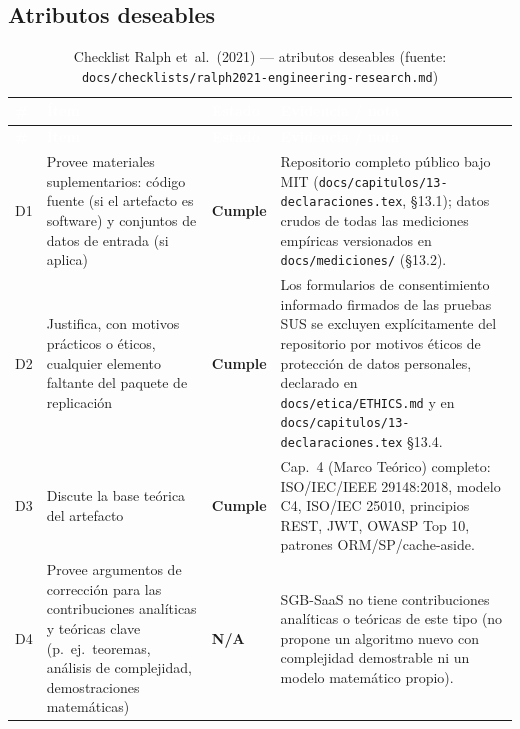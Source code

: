 \subsection{Atributos deseables}

\begin{center}
\scriptsize
\renewcommand{\arraystretch}{1.15}
\begin{longtable}{|p{0.7cm}|p{4.2cm}|p{1.6cm}|p{7.0cm}|}
\caption{Checklist Ralph et~al.\ (2021) --- atributos deseables
  (fuente: \texttt{docs/checklists/ralph2021-engineering-research.md})}
\label{tab:anexo-ralph-deseables}\\
\hline
\rowcolor{verdeuteq}
\textcolor{white}{\textbf{\#}} &
\textcolor{white}{\textbf{Ítem}} &
\textcolor{white}{\textbf{Estado}} &
\textcolor{white}{\textbf{Evidencia / nota}} \\
\hline
\endfirsthead
\hline
\rowcolor{verdeuteq}
\textcolor{white}{\textbf{\#}} &
\textcolor{white}{\textbf{Ítem}} &
\textcolor{white}{\textbf{Estado}} &
\textcolor{white}{\textbf{Evidencia / nota}} \\
\hline
\endhead
\hline
\endfoot
D1 & Provee materiales suplementarios: código fuente (si el artefacto es software) y conjuntos de datos de entrada (si aplica) & \textbf{Cumple} & Repositorio completo público bajo MIT (\texttt{docs/capitulos/13-declaraciones.tex}, §13.1); datos crudos de todas las mediciones empíricas versionados en \texttt{docs/mediciones/} (§13.2). \\
\hline
D2 & Justifica, con motivos prácticos o éticos, cualquier elemento faltante del paquete de replicación & \textbf{Cumple} & Los formularios de consentimiento informado firmados de las pruebas SUS se excluyen explícitamente del repositorio por motivos éticos de protección de datos personales, declarado en \texttt{docs/etica/ETHICS.md} y en \texttt{docs/capitulos/13-declaraciones.tex} §13.4. \\
\hline
D3 & Discute la base teórica del artefacto & \textbf{Cumple} & Cap.\ 4 (Marco Teórico) completo: ISO/IEC/IEEE 29148:2018, modelo C4, ISO/IEC 25010, principios REST, JWT, OWASP Top 10, patrones ORM/SP/cache-aside. \\
\hline
D4 & Provee argumentos de corrección para las contribuciones analíticas y teóricas clave (p.\ ej.\ teoremas, análisis de complejidad, demostraciones matemáticas) & \textbf{N/A} & SGB-SaaS no tiene contribuciones analíticas o teóricas de este tipo (no propone un algoritmo nuevo con complejidad demostrable ni un modelo matemático propio). \\

\end{longtable}
\end{center}
